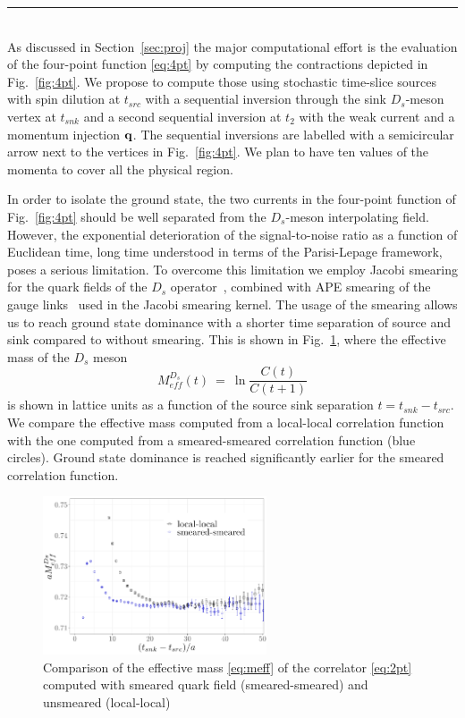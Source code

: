 \label{sec:algos}
\rule{\textwidth}{0.4pt}\\

As discussed in Section~\ref{sec:proj} the major computational effort is 
the evaluation of the four-point function \eqref{eq:4pt} by computing the
contractions depicted in Fig.~\ref{fig:4pt}.
We propose to compute those using stochastic time-slice sources with
spin dilution at $t_{src}$ with a sequential inversion through the
sink $D_s$-meson vertex at $t_{snk}$ and a second sequential inversion
at $t_2$ with the weak current and a momentum injection ${\bf q}$.
The sequential inversions are labelled with a semicircular arrow next to
the vertices in Fig.~\ref{fig:4pt}. We plan to have ten values of the
momenta to cover all the physical region.

In order to isolate the ground state, the two currents in the
four-point function of Fig.~\ref{fig:4pt} should be well separated
from the $D_s$-meson interpolating field. However, the exponential
deterioration of the signal-to-noise ratio as a function of Euclidean
time, long time understood in terms of the Parisi-Lepage framework,
poses a serious limitation. To overcome this limitation we employ
Jacobi smearing for the quark fields of the $D_s$
operator~\cite{Allton:1993wc}, combined with APE smearing of the gauge
links~\cite{FALCIONI1985624} used in the Jacobi smearing kernel.  
The usage of the smearing allows us to reach ground state dominance 
with a shorter time separation of source and sink compared to without
smearing. This is shown in Fig.~\ref{fig:smearing}, where the
effective mass of the $D_s$ meson
\begin{equation}\label{eq:meff}
	M_{eff}^{D_s}(t)\ =\ \ln\frac{C(t)}{C(t+1)}	
\end{equation}
is shown in lattice units as a function of the source sink separation $t=t_{snk}-t_{src}$. We compare the effective mass
computed from a local-local correlation function with the one computed from
a smeared-smeared correlation function (blue circles). Ground state
dominance is reached significantly earlier for the smeared correlation
function. 
             
\begin{figure}
  \includegraphics[width=0.59\textwidth]{plots/smearing_MDs.pdf}
  \caption{Comparison of the effective mass \eqref{eq:meff} of the correlator
    \eqref{eq:2pt}  computed with
    smeared quark field (smeared-smeared) and unsmeared (local-local)} 
  \label{fig:smearing}
\end{figure}

